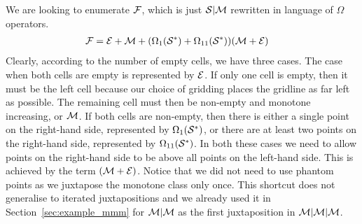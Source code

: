 \documentclass[12pt, a4paper, twoside]{report}
\begin{document}
We are looking to enumerate $\mathcal{F}$, which is just $\mathcal{S}|\mathcal{M}$ rewritten in language of $\Omega$ operators.
\begin{align}
  \mathcal{F} &=   \mathcal{E} + \mathcal{M} + (\Omega_1(\mathcal{S}^*) + \Omega_{11}(\mathcal{S}^*))(\mathcal{M}+\mathcal{E})
\end{align}
Clearly, according to the number of empty cells, we have three cases. The case when both cells are empty is represented by $\mathcal{E}$. If only one cell is empty, then it must be the left cell because our choice of gridding places the gridline as far left as possible. The remaining cell must then be non-empty and monotone increasing, or $\mathcal{M}$. If both cells are non-empty, then there is either a single point on the right-hand side, represented by $\Omega_1(\mathcal{S}^*)$, or there are at least two points on the right-hand side, represented by $\Omega_{11}(\mathcal{S}^*)$. In both these cases we need to allow points on the right-hand side to be above all points on the left-hand side. This is achieved by the term $(\mathcal{M} + \mathcal{E})$. Notice that we did not need to use phantom points as we juxtapose the monotone class only once. This shortcut does not generalise to iterated juxtapositions and we already used it in Section~\ref{sec:example_mmm} for $\mathcal{M}|\mathcal{M}$ as the first juxtaposition in $\mathcal{M}|\mathcal{M}|\mathcal{M}$.
\end{document}
